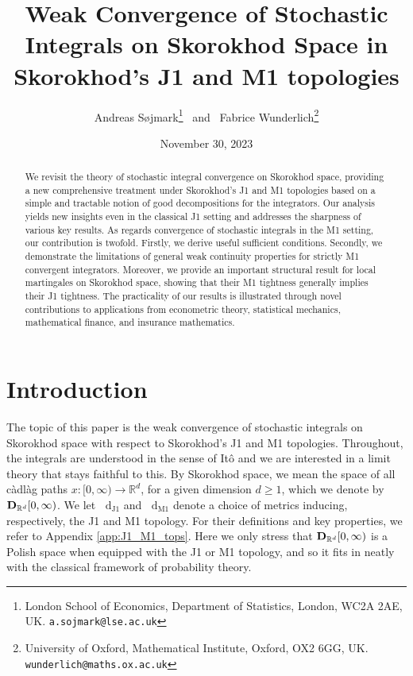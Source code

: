 \documentclass[11pt]{article}
\title{Weak Convergence of Stochastic Integrals on Skorokhod Space in Skorokhod's J1 and M1 topologies}
\date{November 30, 2023}
\author{Andreas S\o jmark\thanks{London School of Economics, Department of Statistics, London, WC2A 2AE, UK. \texttt{a.sojmark@lse.ac.uk}} \,\; and \, Fabrice Wunderlich\thanks{University of Oxford, Mathematical Institute, Oxford, OX2 6GG, UK. \texttt{wunderlich@maths.ox.ac.uk}}  }
\date{}
\theoremstyle{definition}\newtheorem{example}[theorem]{Example}
\theoremstyle{definition}\newtheorem{counterexample}[theorem]{Counterexample}
\theoremstyle{definition}\newtheorem{remark}[theorem]{Remark}
\theoremstyle{definition}\newtheorem{defi}[theorem]{Definition}
\numberwithin{equation}{section}
\newcommand{\R}{\mathbb{R}}
\newcommand{\D}{{\bf D}}											%
\newcommand*\diff{\mathop{}\!\mathrm{d}}								%
\renewcommand{\|}{\; : \, \;}											%
\newcommand{\dJ}{\diff_{\operatorname{J1}}}								%
\newcommand{\dM}{\diff_{\operatorname{M1}}}							%
\begin{document}
	\maketitle
\vspace{-9pt}
	
	
	\begin{abstract}
		We revisit the theory of stochastic integral convergence on Skorokhod space, providing a new comprehensive treatment under Skorokhod's J1 and M1 topologies based on a simple and tractable notion of good decompositions for the integrators. Our analysis yields new insights even in the classical J1 setting and addresses the sharpness of various key results. As regards convergence of stochastic integrals in the M1 setting, our contribution is twofold. Firstly, we derive useful sufficient conditions. Secondly, we demonstrate the limitations of general weak continuity properties for strictly M1 convergent integrators. Moreover, we provide an important structural result for local martingales on Skorokhod space, showing that their M1 tightness generally implies their J1 tightness. The practicality of our results is illustrated through novel contributions to applications from econometric theory, statistical mechanics, mathematical finance, and insurance mathematics.
	\end{abstract}
 \vspace{1pt}
\section{Introduction}

The topic of this paper is the weak convergence of stochastic integrals on Skorokhod space with respect to Skorokhod's J1 and M1 topologies. Throughout, the integrals are understood in the sense of It{\^o} and we are interested in a limit theory that stays faithful to this. By Skorokhod space, we mean the space of all c\`adl\`ag paths $x:[0,\infty)\rightarrow  \mathbb{R}^d$, for a given dimension $d\geq 1$, which we denote by $\D_{\R^d}[0,\infty)$. We let $\dJ$ and $\dM$ denote a choice of metrics inducing, respectively, the J1 and M1 topology. For their definitions and key properties, we refer to Appendix \ref{app:J1_M1_tops}. Here we only stress that $\D_{\R^d}[0,\infty)$ is a Polish space when equipped with the J1 or M1 topology, and so it fits in neatly with the classical framework of probability theory.
\end{document}
